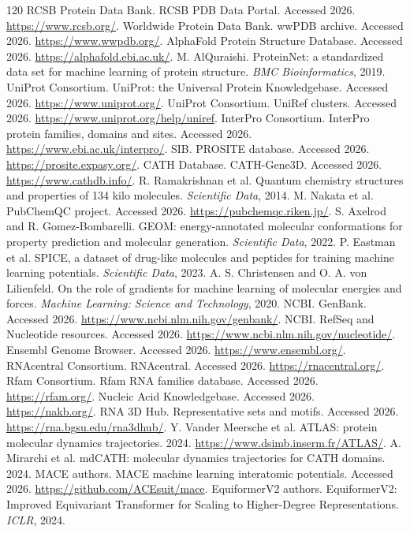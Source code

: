 \documentclass[11pt]{article}
\newcommand{\1}{\mathbf{1}}
\begin{document}
\begin{thebibliography}{120}
 RCSB Protein Data Bank. RCSB PDB Data Portal. Accessed 2026. \url{https://www.rcsb.org/}.
 Worldwide Protein Data Bank. wwPDB archive. Accessed 2026. \url{https://www.wwpdb.org/}.
 AlphaFold Protein Structure Database. Accessed 2026. \url{https://alphafold.ebi.ac.uk/}.
 M. AlQuraishi. ProteinNet: a standardized data set for machine learning of protein structure. \emph{BMC Bioinformatics}, 2019.
 UniProt Consortium. UniProt: the Universal Protein Knowledgebase. Accessed 2026. \url{https://www.uniprot.org/}.
 UniProt Consortium. UniRef clusters. Accessed 2026. \url{https://www.uniprot.org/help/uniref}.
 InterPro Consortium. InterPro protein families, domains and sites. Accessed 2026. \url{https://www.ebi.ac.uk/interpro/}.
 SIB. PROSITE database. Accessed 2026. \url{https://prosite.expasy.org/}.
 CATH Database. CATH-Gene3D. Accessed 2026. \url{https://www.cathdb.info/}.
 R. Ramakrishnan et al. Quantum chemistry structures and properties of 134 kilo molecules. \emph{Scientific Data}, 2014.
 M. Nakata et al. PubChemQC project. Accessed 2026. \url{https://pubchemqc.riken.jp/}.
 S. Axelrod and R. Gomez-Bombarelli. GEOM: energy-annotated molecular conformations for property prediction and molecular generation. \emph{Scientific Data}, 2022.
 P. Eastman et al. SPICE, a dataset of drug-like molecules and peptides for training machine learning potentials. \emph{Scientific Data}, 2023.
 A. S. Christensen and O. A. von Lilienfeld. On the role of gradients for machine learning of molecular energies and forces. \emph{Machine Learning: Science and Technology}, 2020.
 NCBI. GenBank. Accessed 2026. \url{https://www.ncbi.nlm.nih.gov/genbank/}.
 NCBI. RefSeq and Nucleotide resources. Accessed 2026. \url{https://www.ncbi.nlm.nih.gov/nucleotide/}.
 Ensembl Genome Browser. Accessed 2026. \url{https://www.ensembl.org/}.
 RNAcentral Consortium. RNAcentral. Accessed 2026. \url{https://rnacentral.org/}.
 Rfam Consortium. Rfam RNA families database. Accessed 2026. \url{https://rfam.org/}.
 Nucleic Acid Knowledgebase. Accessed 2026. \url{https://nakb.org/}.
 RNA 3D Hub. Representative sets and motifs. Accessed 2026. \url{https://rna.bgsu.edu/rna3dhub/}.
 Y. Vander Meersche et al. ATLAS: protein molecular dynamics trajectories. 2024. \url{https://www.dsimb.inserm.fr/ATLAS/}.
 A. Mirarchi et al. mdCATH: molecular dynamics trajectories for CATH domains. 2024.
 MACE authors. MACE machine learning interatomic potentials. Accessed 2026. \url{https://github.com/ACEsuit/mace}.
 EquiformerV2 authors. EquiformerV2: Improved Equivariant Transformer for Scaling to Higher-Degree Representations. \emph{ICLR}, 2024.
\end{thebibliography}
\end{document}
